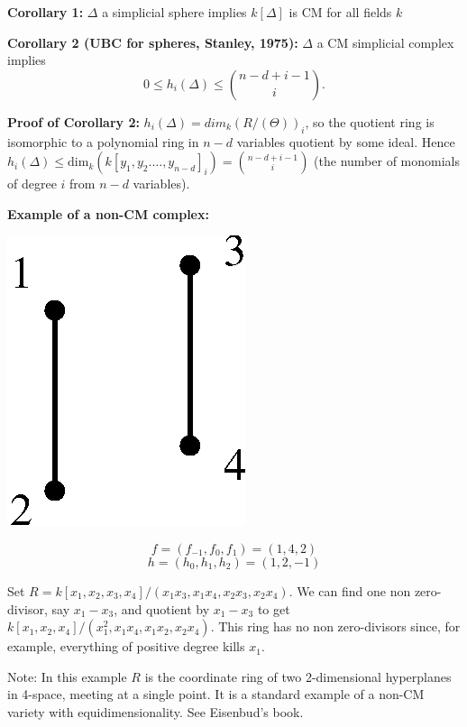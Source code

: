 \documentclass{amsart}
\begin{document}
{\bf Corollary 1:} $\Delta$ a simplicial sphere implies $k[\Delta]$ is CM for 
all fields $k$

{\bf Corollary 2 (UBC for spheres, Stanley, 1975):} $\Delta$ a CM simplicial 
complex implies
$$0 \leq h_i(\Delta) \leq {{n-d+i-1}\choose{i}}.$$

{\bf Proof of Corollary 2:} $h_i(\Delta) = dim_k(R/(\Theta))_i$, so the quotient ring is 
isomorphic to a polynomial ring in $n-d$ variables quotient by 
some ideal. Hence $h_i(\Delta) \leq \textrm{dim}_k(k[y_1, y_2. \ldots, y_{n-d}]_i) 
= {{n-d+i-1}\choose{i}}$ (the number of monomials of degree $i$ from 
$n-d$ variables).

{\bf Example of a non-CM complex:}

\begin{center}
\includegraphics[totalheight=1in]{vic3fig4}
\end{center}

$$f = (f_{-1}, f_0, f_1) = (1, 4, 2)$$
$$h = (h_0, h_1, h_2) = (1, 2, -1)$$

Set $R = k[x_1, x_2, x_3, x_4]/(x_1 x_3, x_1 x_4, x_2 x_3, x_2 x_4)$. 
We can find one non zero-divisor, say $x_1 - x_3$, and quotient by $x_1 
- x_3$ to get $k[x_1, x_2, x_4]/(x_1^2, x_1 x_4, x_1 x_2, x_2 x_4)$. This 
ring has no non zero-divisors since, for example, everything of positive degree kills $x_1$.

Note: In this example $R$ is the coordinate ring of two 2-dimensional 
hyperplanes in 4-space, meeting at a single point. It is a standard 
example of a non-CM variety with equidimensionality. See Eisenbud's 
book.
\end{document}
